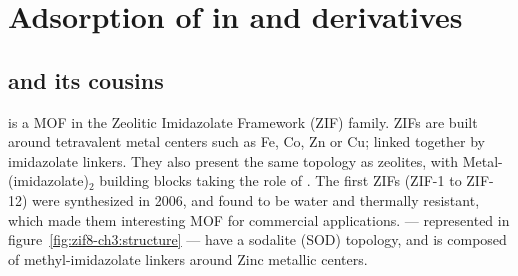 \documentclass[thesis]{subfiles}
\begin{document}

\clearpage
\section{Adsorption of  in  and derivatives}

\subsection{ and its cousins}

 is a MOF in the Zeolitic Imidazolate Framework (ZIF) family. ZIFs are
built around tetravalent metal centers such as Fe, Co, Zn or Cu; linked together
by imidazolate linkers. They also present the same topology as zeolites, with
Metal-(imidazolate)$_2$ building blocks taking the role of . The first
ZIFs (ZIF-1 to ZIF-12) were synthesized in 2006\cite{Park2006}, and found to be
water and thermally resistant, which made them interesting MOF for commercial
applications.  --- represented in figure~\ref{fig:zif8-ch3:structure} ---
have a sodalite (SOD) topology, and is composed of methyl-imidazolate linkers
around Zinc metallic centers.
\end{document}
